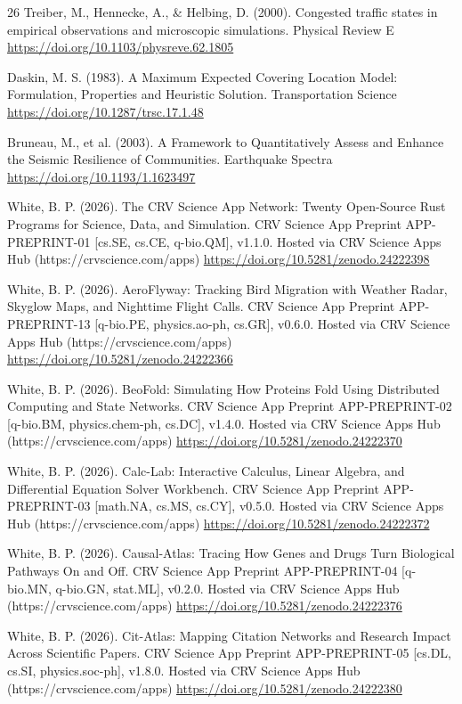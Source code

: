 \documentclass[10pt,letterpaper]{article}
\begin{document}
\begin{thebibliography}{26}
 Treiber, M., Hennecke, A., \& Helbing, D. (2000). Congested traffic states in empirical observations and microscopic simulations. Physical Review E \url{https://doi.org/10.1103/physreve.62.1805}

 Daskin, M. S. (1983). A Maximum Expected Covering Location Model: Formulation, Properties and Heuristic Solution. Transportation Science \url{https://doi.org/10.1287/trsc.17.1.48}

 Bruneau, M., et al. (2003). A Framework to Quantitatively Assess and Enhance the Seismic Resilience of Communities. Earthquake Spectra \url{https://doi.org/10.1193/1.1623497}

 White, B. P. (2026). The CRV Science App Network: Twenty Open-Source Rust Programs for Science, Data, and Simulation. CRV Science App Preprint APP-PREPRINT-01 [cs.SE, cs.CE, q-bio.QM], v1.1.0. Hosted via CRV Science Apps Hub (https://crvscience.com/apps) \url{https://doi.org/10.5281/zenodo.24222398}

 White, B. P. (2026). AeroFlyway: Tracking Bird Migration with Weather Radar, Skyglow Maps, and Nighttime Flight Calls. CRV Science App Preprint APP-PREPRINT-13 [q-bio.PE, physics.ao-ph, cs.GR], v0.6.0. Hosted via CRV Science Apps Hub (https://crvscience.com/apps) \url{https://doi.org/10.5281/zenodo.24222366}

 White, B. P. (2026). BeoFold: Simulating How Proteins Fold Using Distributed Computing and State Networks. CRV Science App Preprint APP-PREPRINT-02 [q-bio.BM, physics.chem-ph, cs.DC], v1.4.0. Hosted via CRV Science Apps Hub (https://crvscience.com/apps) \url{https://doi.org/10.5281/zenodo.24222370}

 White, B. P. (2026). Calc-Lab: Interactive Calculus, Linear Algebra, and Differential Equation Solver Workbench. CRV Science App Preprint APP-PREPRINT-03 [math.NA, cs.MS, cs.CY], v0.5.0. Hosted via CRV Science Apps Hub (https://crvscience.com/apps) \url{https://doi.org/10.5281/zenodo.24222372}

 White, B. P. (2026). Causal-Atlas: Tracing How Genes and Drugs Turn Biological Pathways On and Off. CRV Science App Preprint APP-PREPRINT-04 [q-bio.MN, q-bio.GN, stat.ML], v0.2.0. Hosted via CRV Science Apps Hub (https://crvscience.com/apps) \url{https://doi.org/10.5281/zenodo.24222376}

 White, B. P. (2026). Cit-Atlas: Mapping Citation Networks and Research Impact Across Scientific Papers. CRV Science App Preprint APP-PREPRINT-05 [cs.DL, cs.SI, physics.soc-ph], v1.8.0. Hosted via CRV Science Apps Hub (https://crvscience.com/apps) \url{https://doi.org/10.5281/zenodo.24222380}


\end{thebibliography}
\end{document}
